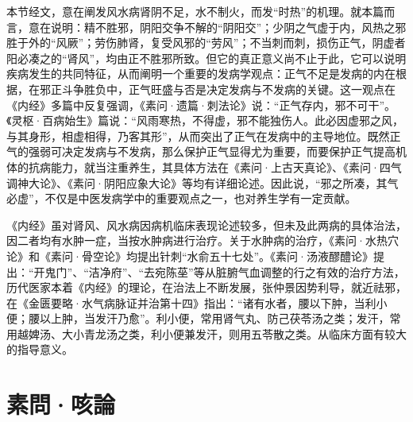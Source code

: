 \documentclass[draft,12pt]{ctexbook}
\begin{document}


本节经文，意在阐发风水病肾阴不足，水不制火，而发“时热”的机理。就本篇而言，意在说明：精不胜邪，阴阳交争不解的“阴阳交”；少阴之气虚于内，风热之邪胜于外的“风厥”；劳伤肺肾，复受风邪的“劳风”；不当刺而刺，损伤正气，阴虚者阳必凑之的“肾风”，均由正不胜邪所致。但它的真正意义尚不止于此，它可以说明疾病发生的共同特征，从而阐明一个重要的发病学观点：正气不足是发病的内在根据，在邪正斗争胜负中，正气旺盛与否是决定发病与不发病的关键。这一观点在《内经》多篇中反复强调，《素问·遗篇·刺法论》说：“正气存内，邪不可干”。《灵枢·百病始生》篇说：“风雨寒热，不得虚，邪不能独伤人。此必因虚邪之风，与其身形，相虚相得，乃客其形”，从而突出了正气在发病中的主导地位。既然正气的强弱可决定发病与不发病，那么保护正气显得尤为重要，而要保护正气提高机体的抗病能力，就当注重养生，其具体方法在《素问·上古天真论》、《素问·四气调神大论》、《素问·阴阳应象大论》等均有详细论述。因此说，“邪之所凑，其气必虚”，不仅是中医发病学中的重要观点之一，也对养生学有一定贡献。



《内经》虽对肾风、风水病因病机临床表现论述较多，但未及此两病的具体治法，因二者均有水肿一症，当按水肿病进行治疗。关于水肿病的治疗，《素问·水热穴论》和《素问·骨空论》均提出针刺“水俞五十七处”。《素问·汤液醪醴论》提出：“开鬼门”、“洁净府”、“去宛陈莝”等从脏腑气血调整的行之有效的治疗方法，历代医家本着《内经》的理论，在治法上不断发展，张仲景因势利导，就近祛邪，在《金匮要略·水气病脉证并治第十四》指出：“诸有水者，腰以下肿，当利小便；腰以上肿，当发汗乃愈”。利小便，常用肾气丸、防己茯苓汤之类；发汗，常用越婢汤、大小青龙汤之类，利小便兼发汗，则用五苓散之类。从临床方面有较大的指导意义。

\section{素問·咳論}%

\end{document}
